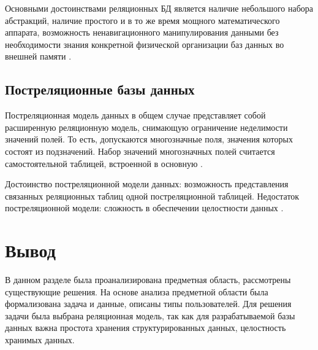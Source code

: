 Основными достоинствами реляционных БД является наличие небольшого набора абстракций, наличие простого и в то же время мощного математического аппарата, возможность ненавигационного манипулирования данными без необходимости знания конкретной физической организации баз данных во внешней памяти \cite{info_db_kuznecov}.

\subsection{Постреляционные базы данных}

Постреляционная модель данных в общем случае представляет собой расширенную реляционную модель, снимающую ограничение неделимости значений полей. То есть, допускаются многозначные поля, значения которых состоят из подзначений. Набор значений многозначных полей считается самостоятельной таблицей, встроенной в основную \cite{info_db_sopchenko}.

Достоинство постреляционной модели данных: возможность представления связанных реляционных таблиц одной постреляционной таблицей.  Недостаток постреляционной модели: сложность в обеспечении целостности данных \cite{info_db_sopchenko}.
              
\clearpage
                       
\section*{Вывод} 

В данном разделе была проанализирована предметная область, рассмотрены существующие решения. На основе анализа предметной области была формализована задача и данные, описаны типы пользователей. Для решения задачи была выбрана реляционная модель, так как для разрабатываемой базы данных важна простота хранения структурированных данных, целостность хранимых данных.
